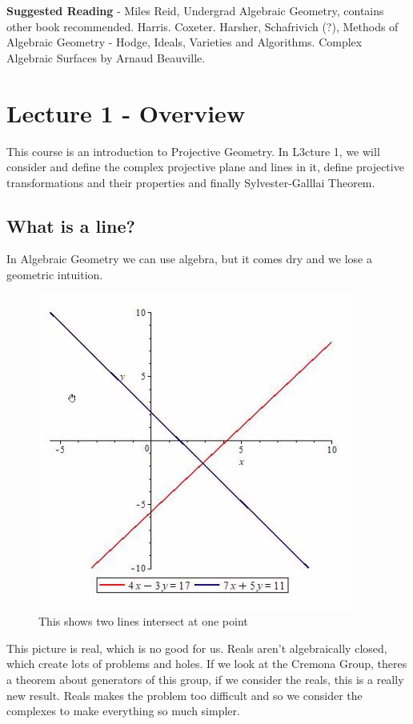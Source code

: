 \documentclass{article}
\begin{document}
  \maketitle

\textbf{Suggested Reading} - Miles Reid, Undergrad Algebraic Geometry, contains other book recommended. Harris. Coxeter. Harsher, Schafrivich (?), Methods of Algebraic Geometry - Hodge, Ideals, Varieties and Algorithms. Complex Algebraic Surfaces by Arnaud Beauville.\\

\section{Lecture 1 - Overview}
This course is an introduction to Projective Geometry. In L3cture 1, we will consider and define the complex projective plane and lines in it, define projective transformations and their properties and finally Sylvester-Galllai Theorem.

\subsection{What is a line?}
In Algebraic Geometry we can use algebra, but it comes dry and we lose a geometric intuition.
\begin{figure}[!ht]
\centering
\includegraphics{./figures/L1.1}
\caption{This shows two lines intersect at one point}
\end{figure}

This picture is real, which is no good for us. Reals aren't algebraically closed, which create lots of problems and holes. If we look at the Cremona Group, theres a theorem about generators of this group, if we consider the reals, this is a really new result. Reals makes the problem too difficult and so we consider the complexes to make everything so much simpler.\\
\end{document}
